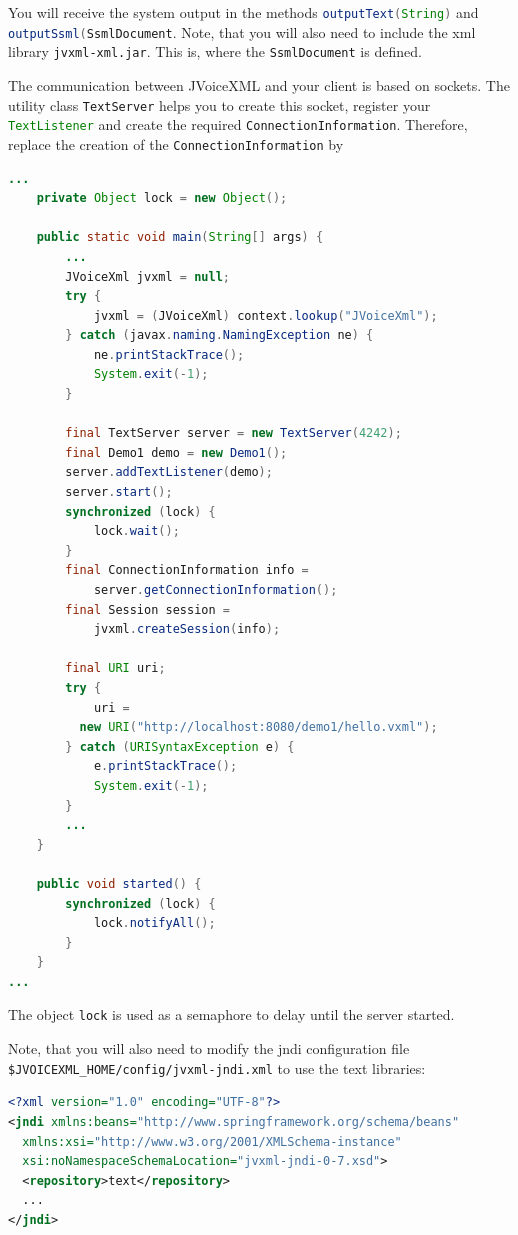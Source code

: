 \documentclass[11pt,a4paper]{article}
\begin{document}
You will receive the system output in the methods
\lstinline[language=Java]{outputText(String)} and
\lstinline[language=Java]{outputSsml(SsmlDocument}. Note, that you will also
need to include the xml library \texttt{jvxml-xml.jar}. This is, where the
\lstinline[language=Java]{SsmlDocument} is defined.

The communication between JVoiceXML and your client is based on sockets. The
utility class \lstinline[language=Java]{TextServer} helps you to create this
socket, register your \lstinline[language=Java]{TextListener} and create the
required \lstinline[language=Java]{ConnectionInformation}. Therefore, replace
the creation of the \lstinline[language=Java]{ConnectionInformation} by

\begin{lstlisting}[language=Java]
...
    private Object lock = new Object();

    public static void main(String[] args) {
        ...
        JVoiceXml jvxml = null;
        try {
            jvxml = (JVoiceXml) context.lookup("JVoiceXml");
        } catch (javax.naming.NamingException ne) {
            ne.printStackTrace();
            System.exit(-1);
        }

        final TextServer server = new TextServer(4242);
        final Demo1 demo = new Demo1();
        server.addTextListener(demo);
        server.start();
        synchronized (lock) {
            lock.wait();
        }
        final ConnectionInformation info =
            server.getConnectionInformation();
        final Session session = 
            jvxml.createSession(info);

        final URI uri;
        try {
            uri = 
          new URI("http://localhost:8080/demo1/hello.vxml");
        } catch (URISyntaxException e) {
            e.printStackTrace();
            System.exit(-1);
        }
        ...
    }

    public void started() {
        synchronized (lock) {
            lock.notifyAll();
        }
    }
...
\end{lstlisting}

The object \lstinline[language=Java]{lock} is used as a semaphore to delay until
the server started.

Note, that you will also need to modify the jndi configuration file
\texttt{\${JVOICEXML\_HOME}/config/jvxml-jndi.xml} to use the text libraries:

\begin{lstlisting}[language=XML]
<?xml version="1.0" encoding="UTF-8"?>
<jndi xmlns:beans="http://www.springframework.org/schema/beans"
  xmlns:xsi="http://www.w3.org/2001/XMLSchema-instance"
  xsi:noNamespaceSchemaLocation="jvxml-jndi-0-7.xsd">
  <repository>text</repository>
  ...
</jndi>
\end{lstlisting}
\end{document}

